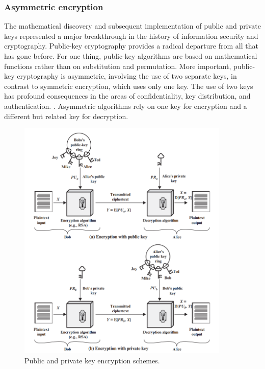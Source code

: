 \documentclass[letterpaper,12pt]{article}
\begin{document}
    \subsubsection{Asymmetric encryption}
    The mathematical discovery and subsequent implementation of public and private keys represented a major breakthrough in the history of information security and cryptography. Public-key cryptography provides a radical departure from all that has gone before. For one thing, public-key algorithms are based on mathematical functions rather than on substitution and permutation. More important, public-key cryptography is asymmetric, involving the use of two separate keys, in contrast to symmetric encryption, which uses only one key. The use of two keys has profound consequences in the areas of confidentiality, key distribution, and authentication. \cite{WS2017-PKI}. Asymmetric algorithms rely on one key for encryption and a different but related key for decryption.
    \begin{figure}[H]
    \centering
    \includegraphics[width=0.9\textwidth]{assets/asymk.png}
    \caption{Public and private key encryption schemes.}
    \label{fig:CRP_CHAT}
\end{figure}
\end{document}
